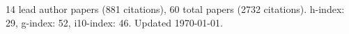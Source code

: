 14 lead author papers (881 citations),
60 total papers (2732 citations).\newline
h-index: 29, g-index: 52, i10-index: 46. Updated \today.